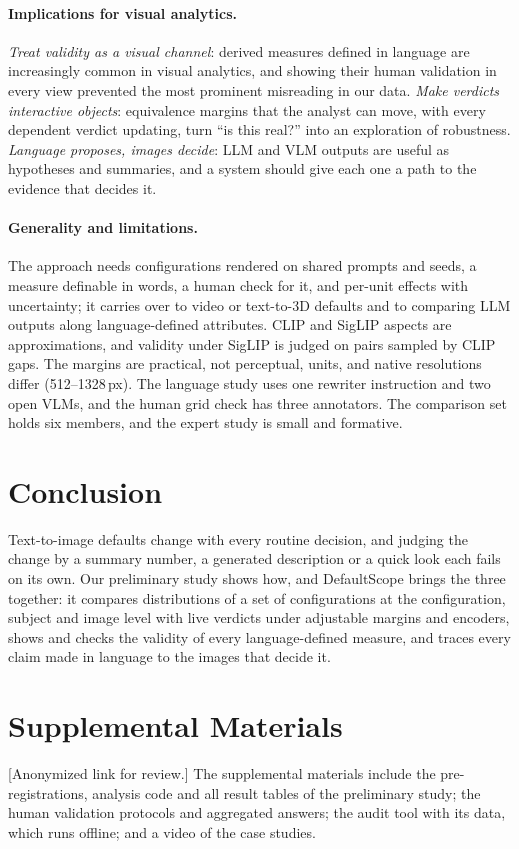 \documentclass[review]{vgtc}                 %
\newcommand{\pending}[1]{\textcolor{red!70!black}{[#1]}}
\newcommand{\sysname}{DefaultScope}
\begin{document}
\paragraph{Implications for visual analytics.}
\emph{Treat validity as a visual channel}: derived measures defined in language are increasingly common in visual analytics, and showing their human validation in every view prevented the most prominent misreading in our data. \emph{Make verdicts interactive objects}: equivalence margins that the analyst can move, with every dependent verdict updating, turn ``is this real?'' into an exploration of robustness. \emph{Language proposes, images decide}: LLM and VLM outputs are useful as hypotheses and summaries, and a system should give each one a path to the evidence that decides it.

\paragraph{Generality and limitations.}
The approach needs configurations rendered on shared prompts and seeds, a measure definable in words, a human check for it, and per-unit effects with uncertainty; it carries over to video or text-to-3D defaults and to comparing LLM outputs along language-defined attributes. CLIP and SigLIP aspects are approximations, and validity under SigLIP is judged on pairs sampled by CLIP gaps. The margins are practical, not perceptual, units, and native resolutions differ (512--1328\,px). The language study uses one rewriter instruction and two open VLMs, and the human grid check has three annotators. The comparison set holds six members, and the expert study is small and formative.

\section{Conclusion}
Text-to-image defaults change with every routine decision, and judging the change by a summary number, a generated description or a quick look each fails on its own. Our preliminary study shows how, and \sysname{} brings the three together: it compares distributions of a set of configurations at the configuration, subject and image level with live verdicts under adjustable margins and encoders, shows and checks the validity of every language-defined measure, and traces every claim made in language to the images that decide it.

\section*{Supplemental Materials}
\label{sec:supplemental_materials}
\pending{Anonymized link for review.} The supplemental materials include the pre-registrations, analysis code and all result tables of the preliminary study; the human validation protocols and aggregated answers; the audit tool with its data, which runs offline; and a video of the case studies.
\end{document}
